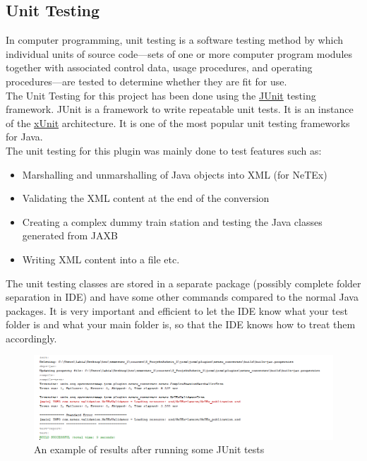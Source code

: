 \subsection{Unit Testing}
In computer programming, unit testing is a software testing method by which individual units of source code—sets of one or more computer program modules together with associated control data, usage procedures, and operating procedures—are tested to determine whether they are fit for use. \cite{WhatIsUnitTesting} \\
The Unit Testing for this project has been done using the \href{https://junit.org/junit5/}{JUnit} testing framework. JUnit is a framework to write repeatable unit tests. It is an instance of the \href{https://en.wikipedia.org/wiki/XUnit}{xUnit} architecture. It is one of the most popular unit testing frameworks for Java.\\
\newline
The unit testing for this plugin was mainly done to test features such as:
\begin{itemize}
\item{Marshalling and unmarshalling of Java objects into XML (for NeTEx)}
\item{Validating the XML content at the end of the conversion}
\item{Creating a complex dummy train station and testing the Java classes generated from JAXB}
\item{Writing XML content into a file etc.}
\end{itemize}
The unit testing classes are stored in a separate package (possibly complete folder separation in IDE) and have some other commands compared to the normal Java packages. It is very important and efficient to let the IDE know what your test folder is and what your main folder is, so that the IDE knows how to treat them accordingly.
\begin{figure}[H]
	\includegraphics[width=\linewidth]{./Images/Implementation/junit_testing_example.png}
	\caption{An example of results after running some JUnit tests}
\end{figure}
\newpage
